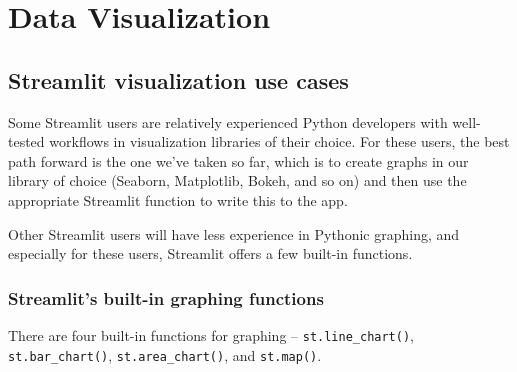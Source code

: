 \chapter{Data Visualization\label{ch03}}
\section{}
\section{Streamlit visualization use cases}
Some Streamlit users are relatively experienced Python developers with well-tested workflows in visualization libraries of their choice. For these users, the best path forward is the one we’ve taken so far, which is to create graphs in our library of choice (Seaborn, Matplotlib, Bokeh, and so on) and then use the appropriate Streamlit function to write this to the app.

Other Streamlit users will have less experience in Pythonic graphing, and especially for these users, Streamlit offers a few built-in functions.

\subsection{Streamlit’s built-in graphing functions}
There are four built-in functions for graphing – \verb|st.line_chart()|, \verb|st.bar_chart()|, \verb|st.area_chart()|, and \verb|st.map()|.